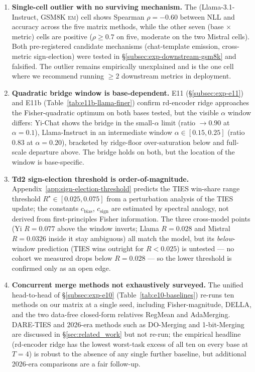\begin{enumerate}[leftmargin=*,topsep=2pt,itemsep=2pt]
\item \textbf{Single-cell outlier with no surviving mechanism.} The
(Llama-3.1-Instruct, GSM8K \textsc{em}) cell shows Spearman $\rho =
-0.60$ between NLL and accuracy across the five matrix methods, while
the other seven (base $\times$ metric) cells are positive
($\rho \geq 0.7$ on five, moderate on the two Mistral cells). Both pre-registered candidate mechanisms (chat-template
emission, cross-metric sign-election) were tested in
\S\ref{subsec:exp-downstream-gsm8k} and falsified. The outlier remains
empirically unexplained and is the one cell where we recommend running
$\geq 2$ downstream metrics in deployment.

\item \textbf{Quadratic bridge window is base-dependent.} E11
(\S\ref{subsec:exp-e11}) and E11b (Table~\ref{tab:e11b-llama-finer})
confirm rd-encoder ridge approaches the Fisher-quadratic optimum on
both bases tested, but the visible $\alpha$ window differs: Yi-Chat
shows the bridge in the small-$\alpha$ limit (ratio $\to 0.90$ at
$\alpha = 0.1$), Llama-Instruct in an intermediate window
$\alpha \in [0.15, 0.25]$ (ratio $0.83$ at $\alpha = 0.20$), bracketed
by ridge-floor over-saturation below and full-scale departure above.
The bridge holds on both, but the location of the window is
base-specific.

\item \textbf{Td2 sign-election threshold is order-of-magnitude.}
Appendix~\ref{app:sign-election-threshold} predicts the TIES win-share
range threshold $R^\star \in [0.025, 0.075]$ from a perturbation
analysis of the TIES update; the constants $c_{\mathrm{bias}}$,
$c_{\mathrm{sign}}$ are estimated by spectral analogy, not derived
from first-principles Fisher information. The three cross-model points
(Yi $R = 0.077$ above the window inverts; Llama $R = 0.028$ and Mistral
$R = 0.0326$ inside it stay ambiguous) all match the model, but its
\emph{below}-window prediction (TIES wins outright for $R < 0.025$) is
untested --- no cohort we measured drops below $R = 0.028$ --- so the
lower threshold is confirmed only as an open edge.

\item \textbf{Concurrent merge methods not exhaustively surveyed.}
The unified head-to-head of \S\ref{subsec:exp-e10}
(Table~\ref{tab:e10-baselines}) re-runs ten methods on our matrix at a
single seed, including Fisher-magnitude, DELLA, and the two data-free
closed-form relatives RegMean and AdaMerging. DARE-TIES and 2026-era
methods such as DO-Merging and 1-bit-Merging are discussed in
\S\ref{sec:related_work} but not re-run; the empirical headline
(rd-encoder ridge has the lowest worst-task excess of all ten on every
base at $T = 4$) is robust to the absence of any single further
baseline, but additional 2026-era comparisons are a fair follow-up.
\end{enumerate}

